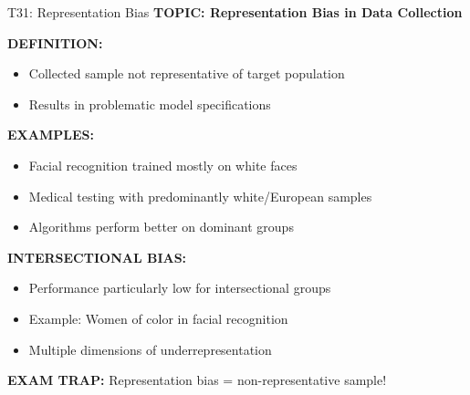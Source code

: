 \documentclass[8pt]{beamer}
\begin{document}
	\begin{frame}{T31: Representation Bias}
		\fontsize{6.5}{7.5}\selectfont
		\textbf{TOPIC: Representation Bias in Data Collection}
		
		\vspace{0.1cm}
		\textbf{DEFINITION:}
		\begin{itemize}
			\item Collected sample not representative of target population
			\item Results in problematic model specifications
		\end{itemize}
		
		\vspace{0.1cm}
		\textbf{EXAMPLES:}
		\begin{itemize}
			\item Facial recognition trained mostly on white faces
			\item Medical testing with predominantly white/European samples
			\item Algorithms perform better on dominant groups
		\end{itemize}
		
		\vspace{0.1cm}
		\textbf{INTERSECTIONAL BIAS:}
		\begin{itemize}
			\item Performance particularly low for intersectional groups
			\item Example: Women of color in facial recognition
			\item Multiple dimensions of underrepresentation
		\end{itemize}
		
		\textcolor{myred}{\textbf{EXAM TRAP:}} Representation bias = \textcolor{myblue}{non-representative sample}!
	\end{frame}
	
\end{document}
